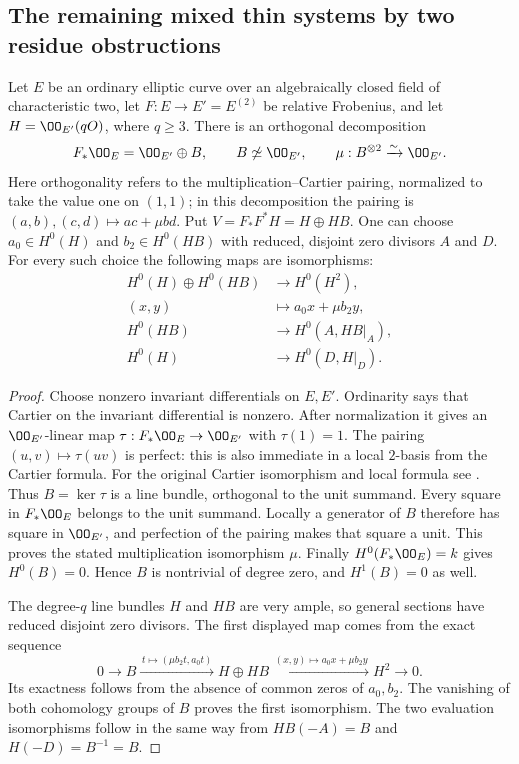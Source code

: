 \subsection{The remaining mixed thin systems by two residue obstructions}
\label{sec:DE-A3-mixed-thin-residues}

\begin{lemma}
\label{lem:DE-A3-ordinary-two-pencils}
Let $E$ be an ordinary elliptic curve over an algebraically closed
field of characteristic two, let $F:E\to E'=E^{(2)}$ be relative
Frobenius, and let $H=\OO_{E'}(qO)$, where $q\ge3$.
There is an orthogonal decomposition
\[
 F_*\OO_E=\OO_{E'}\oplus B,\qquad
 B\not\simeq\OO_{E'},\qquad
 \mu:B^{\otimes2}\xrightarrow{\sim}\OO_{E'}.
\]
Here orthogonality refers to the multiplication--Cartier pairing,
normalized to take the value one on $(1,1)$; in this decomposition
the pairing is $(a,b),(c,d)\mapsto ac+\mu bd$.
Put $V=F_*F^*H=H\oplus HB$.
One can choose $a_0\in H^0(H)$ and $b_2\in H^0(HB)$ with
reduced, disjoint zero divisors $A$ and $D$.
For every such choice the following maps are isomorphisms:
\[
\begin{split}
 H^0(H)\oplus H^0(HB)&\longrightarrow H^0(H^2),\\
 (x,y)&\longmapsto a_0x+\mu b_2y,\\
 H^0(HB)&\longrightarrow H^0(A,HB|_A),\\
 H^0(H)&\longrightarrow H^0(D,H|_D).
\end{split}
\]
\end{lemma}
\begin{proof}
Choose nonzero invariant differentials on $E,E'$.
Ordinarity says that Cartier on the invariant differential is nonzero.
After normalization it gives an $\OO_{E'}$-linear map
$\tau:F_*\OO_E\to\OO_{E'}$ with $\tau(1)=1$.
The pairing $(u,v)\mapsto\tau(uv)$ is perfect: this is also immediate
in a local $2$-basis from the Cartier formula.
For the original Cartier isomorphism and local formula see
\cite[0, Theorem~2.1.9, p.~515]{Illusie1979DRW}.
Thus $B=\ker\tau$ is a line bundle, orthogonal to the unit summand.
Every square in $F_*\OO_E$ belongs to the unit summand.
Locally a generator of $B$ therefore has square in $\OO_{E'}$,
and perfection of the pairing makes that square a unit.
This proves the stated multiplication isomorphism $\mu$.
Finally $H^0(F_*\OO_E)=k$ gives $H^0(B)=0$.
Hence $B$ is nontrivial of degree zero, and $H^1(B)=0$ as well.

The degree-$q$ line bundles $H$ and $HB$ are very ample, so general
sections have reduced disjoint zero divisors.
The first displayed map comes from the exact sequence
\[
 0\longrightarrow B
 \xrightarrow{\,t\mapsto(\mu b_2t,a_0t)\,}
 H\oplus HB
 \xrightarrow{\,(x,y)\mapsto a_0x+\mu b_2y\,}
 H^2\longrightarrow0.
\]
Its exactness follows from the absence of common zeros of $a_0,b_2$.
The vanishing of both cohomology groups of $B$ proves the first
isomorphism.  The two evaluation isomorphisms follow in the same way
from $HB(-A)=B$ and $H(-D)=B^{-1}=B$.
\end{proof}


